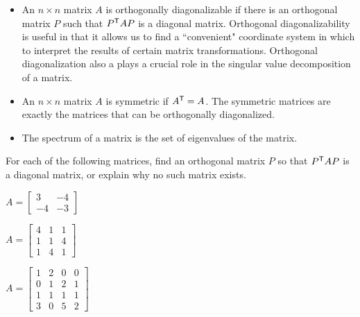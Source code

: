 \begin{itemize}
\item An $n \times n$ matrix $A$ is orthogonally diagonalizable if there is an orthogonal matrix $P$ such that $P^{\mathsf{T}}AP$ is a diagonal matrix. Orthogonal diagonalizability is useful in that it allows us to find a ``convenient" coordinate system in which to interpret the results of certain matrix transformations. Orthogonal diagonalization also  a plays a crucial role in the singular value decomposition of a matrix.
\item An $n \times n$ matrix $A$ is symmetric if $A^{\mathsf{T}} = A$. The symmetric matrices are exactly the matrices that can be orthogonally diagonalized. 
\item The spectrum of a matrix is the set of eigenvalues of the matrix. 
\end{itemize}



\be
\item For each of the following matrices, find an orthogonal matrix $P$ so that $P^{\mathsf{T}}AP$ is a diagonal matrix, or explain why no such matrix exists.
	\ba
\hspace{-0.3in}	\begin{minipage}{1.4in}
	\item $A = \left[ \begin{array}{rr} 3&-4 \\ -4&-3 \end{array} \right]$
	\end{minipage}
	\begin{minipage}{1.4in}
	\item $A = \left[ \begin{array}{ccc} 4&1&1 \\ 1&1&4 \\ 1&4&1 \end{array} \right]$
	\end{minipage}
	\begin{minipage}{1.4in}
	\item $A = \left[ \begin{array}{cccc} 1&2&0&0 \\ 0&1&2&1 \\ 1&1&1&1 \\ 3&0&5&2 \end{array} \right]$
	\end{minipage}
	\ea

